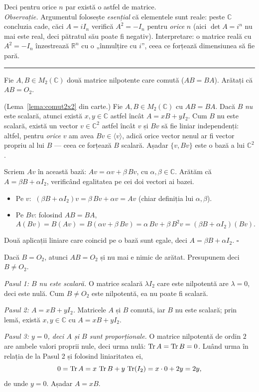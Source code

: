 Deci pentru orice $n$ par există o astfel de matrice.\\[2pt]
\emph{Observație.} Argumentul folosește \emph{esențial} că elementele sunt reale: peste $\mathbb{C}$ concluzia cade, căci $A=iI_n$ verifică $A^2=-I_n$ pentru \emph{orice} $n$ (aici $\det A=i^n$ nu mai este real, deci pătratul său poate fi negativ). Interpretare: o matrice reală cu $A^2=-I_n$ înzestrează $\mathbb{R}^n$ cu o „înmulțire cu $i$'', ceea ce forțează dimensiunea să fie pară.
\vspace{1mm}\hrule

Fie $A,B\in M_2(\mathbb{C})$ două matrice nilpotente care comută ($AB=BA$). Arătați că $AB=O_2$.

\lema
(Lema~\ref{lema:comut2x2} din carte.) Fie $A,B\in M_2(\mathbb{C})$ cu $AB=BA$. Dacă $B$ \emph{nu} este scalară, atunci există $x,y\in\mathbb{C}$ astfel încât $A=xB+yI_2$.
\demo Cum $B$ nu este scalară, există un vector $v\in\mathbb{C}^2$ astfel încât $v$ și $Bv$ să fie liniar independenți: altfel, pentru \emph{orice} $v$ am avea $Bv\in\langle v\rangle$, adică orice vector nenul ar fi vector propriu al lui $B$ --- ceea ce forțează $B$ scalară. Așadar $\{v,Bv\}$ este o bază a lui $\mathbb{C}^2$.

Scriem $Av$ în această bază: $Av=\alpha v+\beta\,Bv$, cu $\alpha,\beta\in\mathbb{C}$. Arătăm că $A=\beta B+\alpha I_2$, verificând egalitatea pe cei doi vectori ai bazei.
\begin{itemize}[nosep,leftmargin=1.6em]
  \item Pe $v$: $\ (\beta B+\alpha I_2)v=\beta\,Bv+\alpha v=Av$ (chiar definiția lui $\alpha,\beta$).
  \item Pe $Bv$: folosind $AB=BA$,
  \[ A(Bv)=B(Av)=B(\alpha v+\beta\,Bv)=\alpha\,Bv+\beta\,B^2v=(\beta B+\alpha I_2)(Bv). \]
\end{itemize}
Două aplicații liniare care coincid pe o bază sunt egale, deci $A=\beta B+\alpha I_2$. $\square$

\sol Dacă $B=O_2$, atunci $AB=O_2$ și nu mai e nimic de arătat. Presupunem deci $B\neq O_2$.

\emph{Pasul 1: $B$ nu este scalară.} O matrice scalară $\lambda I_2$ care este nilpotentă are $\lambda=0$, deci este nulă. Cum $B\neq O_2$ este nilpotentă, ea nu poate fi scalară.

\emph{Pasul 2: $A=xB+yI_2$.} Matricele $A$ și $B$ comută, iar $B$ nu este scalară; prin lemă, există $x,y\in\mathbb{C}$ cu $A=xB+yI_2$.

\emph{Pasul 3: $y=0$, deci $A$ și $B$ sunt proporționale.} O matrice nilpotentă de ordin $2$ are ambele valori proprii nule, deci urma nulă: $\operatorname{Tr} A=\operatorname{Tr} B=0$. Luând urma în relația de la Pasul 2 și folosind liniaritatea ei,
\[ 0=\operatorname{Tr} A=x\,\operatorname{Tr} B+y\,\operatorname{Tr}(I_2)=x\cdot0+2y=2y , \]
de unde $y=0$. Așadar $A=xB$.

